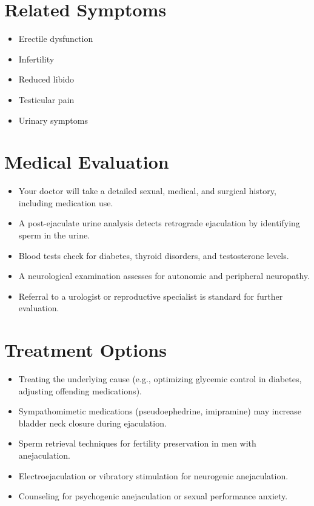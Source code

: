 \section*{Related Symptoms}
\begin{itemize}
  \item Erectile dysfunction
  \item Infertility
  \item Reduced libido
  \item Testicular pain
  \item Urinary symptoms
\end{itemize}


\section*{Medical Evaluation}
\begin{itemize}
  \item Your doctor will take a detailed sexual, medical, and surgical history, including medication use.
  \item A post-ejaculate urine analysis detects retrograde ejaculation by identifying sperm in the urine.
  \item Blood tests check for diabetes, thyroid disorders, and testosterone levels.
  \item A neurological examination assesses for autonomic and peripheral neuropathy.
  \item Referral to a urologist or reproductive specialist is standard for further evaluation.
\end{itemize}

\section*{Treatment Options}
\begin{itemize}
  \item Treating the underlying cause (e.g., optimizing glycemic control in diabetes, adjusting offending medications).
  \item Sympathomimetic medications (pseudoephedrine, imipramine) may increase bladder neck closure during ejaculation.
  \item Sperm retrieval techniques for fertility preservation in men with anejaculation.
  \item Electroejaculation or vibratory stimulation for neurogenic anejaculation.
  \item Counseling for psychogenic anejaculation or sexual performance anxiety.
\end{itemize}

